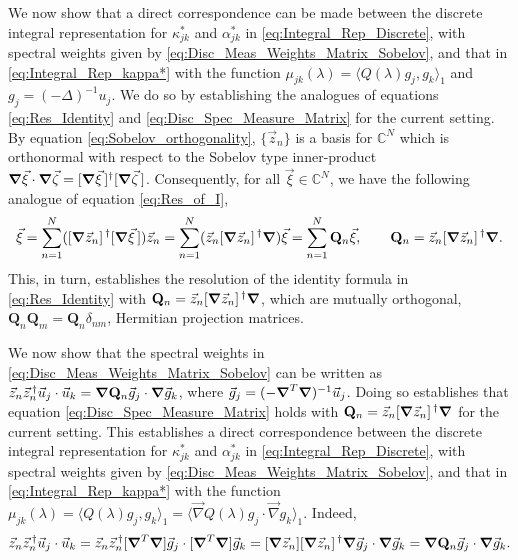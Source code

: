 \documentclass[11pt]{amsart}
\newcommand{\Qb}{\mathbf{Q}}
\newcommand\Bnabla{\mbox{\boldmath${\nabla}$}}
\begin{document}
We now show that a direct correspondence can be made between the
discrete integral representation for $\kappa^*_{jk}$ and $\alpha^*_{jk}$ in
\eqref{eq:Integral_Rep_Discrete}, with spectral weights given by
\eqref{eq:Disc_Meas_Weights_Matrix_Sobelov}, and that in
\eqref{eq:Integral_Rep_kappa*} with the function
$\mu_{jk}(\lambda)=\langle Q(\lambda)g_j,g_k\rangle_1$ and $g_j=(-\Delta)^{-1}u_j$. We do so by
establishing the analogues of equations \eqref{eq:Res_Identity} and
\eqref{eq:Disc_Spec_Measure_Matrix} for the current setting. By
equation \eqref{eq:Sobelov_orthogonality}, $\{\vec{z}_n\}$ is a basis
for $\mathbb{C}^N$ which is orthonormal with respect to the Sobelov
type inner-product
$\Bnabla\vec{\xi}\cdot\Bnabla\vec{\zeta}=[\Bnabla\vec{\xi}\,]^\dagger[\Bnabla\vec{\zeta}\,]$. Consequently, 
for all $\vec{\xi}\in\mathbb{C}^N$, we have the following analogue of equation
\eqref{eq:Res_of_I}, 
%
\begin{align}\label{eq:Res_of_I_Sobelov}
  \vec{\xi}%
         =\sum_{n=1}^N([\Bnabla\vec{z}_n]^{\,\dagger}[\Bnabla\vec{\xi}\,])\vec{z}_n
         =\sum_{n=1}^N(\vec{z}_n[\Bnabla\vec{z}_n]^{\,\dagger}\Bnabla)\vec{\xi}
         =\sum_{n=1}^N\Qb_n\vec{\xi},
         \qquad
  \Qb_n=\vec{z}_n[\Bnabla\vec{z}_n]^{\,\dagger}\Bnabla.
\end{align}
%
This, in turn, establishes the resolution of the identity formula in
\eqref{eq:Res_Identity} with
$\Qb_n=\vec{z}_n[\Bnabla\vec{z}_n]^{\,\dagger}\Bnabla$, which are mutually
orthogonal, $\Qb_n\Qb_m=\Qb_n\delta_{nm}$, Hermitian projection
matrices.





We now show that the spectral weights in 
\eqref{eq:Disc_Meas_Weights_Matrix_Sobelov} can be written as
$\vec{z}_n\vec{z}_n^{\,\dagger}\vec{u}_j\cdot\vec{u}_k=\Bnabla\Qb_n\vec{g}_j\cdot\Bnabla\vec{g}_k$,
where $\vec{g}_j=(-\Bnabla^T\Bnabla)^{-1}\vec{u}_j$. Doing so
establishes that equation \eqref{eq:Disc_Spec_Measure_Matrix} holds
with $\Qb_n=\vec{z}_n[\Bnabla\vec{z}_n]^{\,\dagger}\Bnabla$ for the current
setting. This establishes a direct correspondence between the discrete
integral representation for $\kappa^*_{jk}$ and $\alpha^*_{jk}$ in
\eqref{eq:Integral_Rep_Discrete}, with spectral weights given by 
\eqref{eq:Disc_Meas_Weights_Matrix_Sobelov},
and that in \eqref{eq:Integral_Rep_kappa*} with the function
$\mu_{jk}(\lambda)=\langle Q(\lambda)g_j,g_k\rangle_1=\langle\vec{\nabla}Q(\lambda)g_j\cdot\vec{\nabla}g_k\rangle_1$. Indeed,
%
\begin{align}
  \vec{z}_n\vec{z}_n^{\,\dagger}\vec{u}_j\cdot\vec{u}_k
  =\vec{z}_n\vec{z}_n^{\,\dagger}[\Bnabla^T\Bnabla]\vec{g}_j\cdot[\Bnabla^T\Bnabla]\vec{g}_k
  =[\Bnabla\vec{z}_n][\Bnabla\vec{z}_n]^{\,\dagger}\Bnabla\vec{g}_j\cdot\Bnabla\vec{g}_k
  =\Bnabla\Qb_n\vec{g}_j\cdot\Bnabla\vec{g}_k.
\end{align}
%
\end{document}
